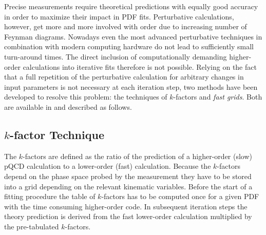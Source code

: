 Precise measurements
require theoretical predictions with equally good accuracy in
order to maximize their impact in PDF fits.  Perturbative
calculations, however, get more and more involved with 
order due to increasing number of Feynman diagrams.
Nowadays even the most advanced perturbative techniques in
combination with modern computing hardware do not lead to sufficiently
small turn-around times. The direct inclusion of computationally
demanding higher-order calculations into iterative fits therefore is
not possible. Relying on the fact that a full repetition of the
perturbative calculation for arbitrary changes in input parameters is
not necessary at each iteration step, two methods have been developed
to resolve this problem: the techniques of $k$-factors and
\emph{fast grids}. Both are available in \fitter and described as follows.

\subsection{$k$-factor Technique}
  The $k$-factors are defined as the ratio of the prediction of a
  higher-order (slow) pQCD calculation to a lower-order (fast)
  calculation. Because the $k$-factors depend on the phase space
  probed by the measurement they have to be stored into a 
  grid depending on
  the relevant kinematic variables. Before the start of
  a fitting procedure the table of $k$-factors has to be computed once
  for a given PDF with the time consuming higher-order code. In
  subsequent iteration steps the theory prediction is derived from the
  fast lower-order calculation multiplied by the pre-tabulated
  $k$-factors.

